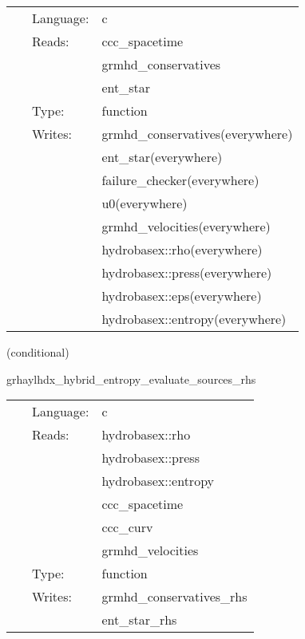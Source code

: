 \documentclass{article}
\begin{document}
 \begin{tabular*}{160mm}{cll} 
~ & Language:  & c \\ 
~ & Reads:  & ccc\_spacetime \\ 
~& ~ &grmhd\_conservatives\\ 
~& ~ &ent\_star\\ 
~ & Type:  & function \\ 
~ & Writes:  & grmhd\_conservatives(everywhere) \\ 
~& ~ &ent\_star(everywhere)\\ 
~& ~ &failure\_checker(everywhere)\\ 
~& ~ &u0(everywhere)\\ 
~& ~ &grmhd\_velocities(everywhere)\\ 
~& ~ &hydrobasex::rho(everywhere)\\ 
~& ~ &hydrobasex::press(everywhere)\\ 
~& ~ &hydrobasex::eps(everywhere)\\ 
~& ~ &hydrobasex::entropy(everywhere)\\ 
\end{tabular*} 


\vspace{5mm}

   (conditional) 

\hspace{5mm} grhaylhdx\_hybrid\_entropy\_evaluate\_sources\_rhs 

\hspace{5mm}{\it entropy+hybrid version of grhaylhdx\_evaluate\_sources\_rhs } 


\hspace{5mm}

 \begin{tabular*}{160mm}{cll} 
~ & Language:  & c \\ 
~ & Reads:  & hydrobasex::rho \\ 
~& ~ &hydrobasex::press\\ 
~& ~ &hydrobasex::entropy\\ 
~& ~ &ccc\_spacetime\\ 
~& ~ &ccc\_curv\\ 
~& ~ &grmhd\_velocities\\ 
~ & Type:  & function \\ 
~ & Writes:  & grmhd\_conservatives\_rhs \\ 
~& ~ &ent\_star\_rhs\\ 
\end{tabular*} 
\end{document}
